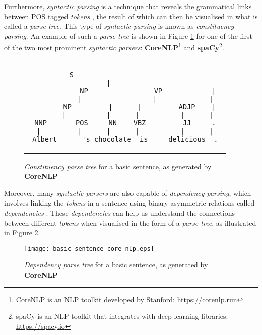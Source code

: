 Furthermore, \textit{syntactic parsing} is a technique that reveals the grammatical links between POS tagged \textit{tokens} \cite{noauthor_syntactic_nodate}, the result of which can then be visualised in what is called a \textit{parse tree}. This type of \textit{syntactic parsing} is known as \textit{constituency parsing}. An example of such a \textit{parse tree} is shown in Figure \ref{fig:constituency_tree_basic_sentence} for one of the first of the two most prominent \textit{syntactic parsers}: \textbf{CoreNLP}\footnote{CoreNLP is an NLP toolkit developed by Stanford: \url{https://corenlp.run}} and \textbf{spaCy}\footnote{spaCy is an NLP toolkit that integrates with deep learning libraries: \url{https://spacy.io}}.

\begin{figure}[H]
\centering
\begin{tabular}{c}
\begin{lstlisting}[numbers=none, basicstyle=\ttfamily, columns=fixed]
                   S                          
             ______|________________________   
            NP                VP            | 
         ___|______        ___|______       |  
        NP         |      |         ADJP    | 
   _____|___       |      |          |      |  
 NNP       POS     NN    VBZ         JJ     . 
  |         |      |      |          |      |  
Albert      's chocolate  is     delicious  .
\end{lstlisting}
\end{tabular}
\caption{\textit{Constituency parse tree} for a basic sentence, as generated by  \textbf{CoreNLP}}
\label{fig:constituency_tree_basic_sentence}
\end{figure}

\noindent
Moreover, many \textit{syntactic parsers} are also capable of \textit{dependency parsing}, which involves linking the \textit{tokens} in a sentence using binary asymmetric relations called \textit{dependencies} \cite{kubler_dependency_nodate}. These \textit{dependencies} can help us understand the connections between different \textit{tokens} when visualised in the form of a \textit{parse tree}, as illustrated in Figure \ref{fig:dependency_tree_basic_sentence}.

\begin{figure}[H]
\centering
\texttt{[image: basic\_sentence\_core\_nlp.eps]}
\caption{\textit{Dependency parse tree} for a basic sentence, as generated by  \textbf{CoreNLP}}
\label{fig:dependency_tree_basic_sentence}
\end{figure}

